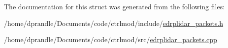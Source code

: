 The documentation for this struct was generated from the following files\-:\begin{DoxyCompactItemize}
\item 
/home/dprandle/\-Documents/code/ctrlmod/include/\hyperlink{edrplidar__packets_8h}{edrplidar\-\_\-packets.\-h}\item 
/home/dprandle/\-Documents/code/ctrlmod/src/\hyperlink{edrplidar__packets_8cpp}{edrplidar\-\_\-packets.\-cpp}\end{DoxyCompactItemize}
